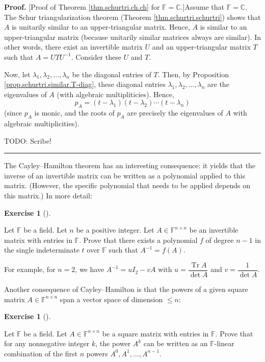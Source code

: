 \documentclass[numbers=enddot,12pt,final,onecolumn,notitlepage]{scrartcl}%
\newcounter{exer}
\numberwithin{exer}{subsection}
\theoremstyle{definition}
\newtheorem{exmp}[exer]{Exercise}
\newenvironment{exercise}[1][]
{\begin{exmp}[#1]\begin{leftbar}}
{\end{leftbar}\end{exmp}}
\newenvironment{proof}[1][Proof]{\noindent\textbf{#1.} }{\ \rule{0.5em}{0.5em}}
\begin{document}
\begin{proof}
[Proof of Theorem \ref{thm.schurtri.ch.ch} for $\mathbb{F}=\mathbb{C}$.]Assume
that $\mathbb{F}=\mathbb{C}$. The Schur triangularization theorem (Theorem
\ref{thm.schurtri.schurtri}) shows that $A$ is unitarily similar to an
upper-triangular matrix. Hence, $A$ is similar to an upper-triangular matrix
(because unitarily similar matrices always are similar). In other words, there
exist an invertible matrix $U$ and an upper-triangular matrix $T$ such that
$A=UTU^{-1}$. Consider these $U$ and $T$.

Now, let $\lambda_{1},\lambda_{2},\ldots,\lambda_{n}$ be the diagonal entries
of $T$. Then, by Proposition \ref{prop.schurtri.similar.T-diag}, these
diagonal entries $\lambda_{1},\lambda_{2},\ldots,\lambda_{n}$ are the
eigenvalues of $A$ (with algebraic multipliticies). Hence,%
\[
p_{A}=\left(  t-\lambda_{1}\right)  \left(  t-\lambda_{2}\right)
\cdots\left(  t-\lambda_{n}\right)
\]
(since $p_{A}$ is monic, and the roots of $p_{A}$ are precisely the
eigenvalues of $A$ with algebraic multiplicities).

TODO: Scribe!
\end{proof}

The Cayley--Hamilton theorem has an interesting consequence: it yields that
the inverse of an invertible matrix can be written as a polynomial applied to
this matrix. (However, the specific polynomial that needs to be applied
depends on this matrix.) In more detail:

\begin{exercise}
\label{exe.schurtri.ch.inverse-poly} Let $\mathbb{F}$ be a field. Let
$n$ be a positive integer. Let $A\in\mathbb{F}^{n\times n}$ be an invertible
matrix with entries in $\mathbb{F}$. Prove that there exists a polynomial $f$
of degree $n-1$ in the single indeterminate $t$ over $\mathbb{F}$ such that
$A^{-1}=f\left(  A\right)  $.
\end{exercise}

For example, for $n=2$, we have $A^{-1}=uI_{2}-vA$ with $u=\dfrac
{\operatorname*{Tr}A}{\det A}$ and $v=\dfrac{1}{\det A}$. \medskip

Another consequence of Cayley--Hamilton is that the powers of a given square
matrix $A\in\mathbb{F}^{n\times n}$ span a vector space of dimension $\leq n$:

\begin{exercise}
\label{exe.schurtri.ch.powers-span} Let $\mathbb{F}$ be a field. Let
$A\in\mathbb{F}^{n\times n}$ be a square matrix with entries in $\mathbb{F}$.
Prove that for any nonnegative integer $k$, the power $A^{k}$ can be written
as an $\mathbb{F}$-linear combination of the first $n$ powers $A^{0}%
,A^{1},\ldots,A^{n-1}$.
\end{exercise}
\end{document}
